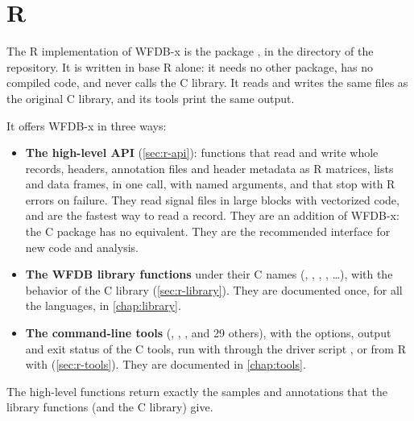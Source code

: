 \chapter{R}
\label{chap:r}

The R implementation of WFDB-x is the package , in the directory  of
the repository. It is written in base R alone: it needs no other package, has no compiled
code, and never calls the C library. It reads and writes the same files as the original C
library, and its tools print the same output.

It offers WFDB-x in three ways:
\begin{itemize}
\item \textbf{The high-level API} (\cref{sec:r-api}): functions that read and write whole
  records, headers, annotation files and header metadata as R matrices, lists and data
  frames, in one call, with named arguments, and that stop with R errors on failure. They
  read signal files in large blocks with vectorized code, and are the fastest way to read
  a record. They are an addition of WFDB-x: the C package has no equivalent. They are the
  recommended interface for new code and analysis.
\item \textbf{The WFDB library functions} under their C names (,
  , , , \ldots), with the behavior of the C library
  (\cref{sec:r-library}). They are documented once, for all the languages, in
  \cref{chap:library}.
\item \textbf{The command-line tools} (, , ,
   and 29 others), with the options, output and exit status of the C tools,
  run with  through the driver script , or from R with
   (\cref{sec:r-tools}). They are documented in \cref{chap:tools}.
\end{itemize}
The high-level functions return exactly the samples and annotations that the library
functions (and the C library) give.

